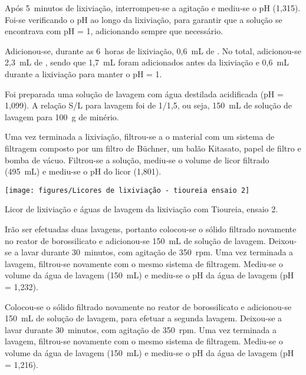 Após 5~minutos de lixiviação, interrompeu-se a agitação e mediu-se o pH (1,315). 
Foi-se verificando o pH ao longo da lixiviação, para garantir que a solução se encontrava com pH = 1, adicionando \acsul{} sempre que necessário.

Adicionou-se, durante as 6~horas de lixiviação, 0,6~mL de \acsul{}. No total, adicionou-se 2,3~mL de \acsul{}, sendo que 1,7~mL foram adicionados antes da lixiviação e 0,6~mL durante a lixiviação para manter o pH = 1.

Foi preparada uma solução de lavagem com água destilada acidificada (pH = 1,099). 
A relação S/L para lavagem foi de 1/1,5, ou seja, 150~mL de solução de lavagem para 100~g de minério.

Uma vez terminada a lixiviação, filtrou-se a o material com um sistema de filtragem composto por um filtro de Büchner, um balão Kitasato, papel de filtro e bomba de vácuo.
Filtrou-se a solução, mediu-se o volume de licor filtrado (495~mL) e mediu-se o pH do licor (1,801).

\begin{marginfigure}
	\centering
	\texttt{[image: figures/Licores de lixiviação - tioureia ensaio 2]}
	\caption{Licor de lixiviação e águas de lavagem da lixiviação com Tioureia, ensaio 2.}
	\label{fig:licores-lixiviacao-tioureia-ensaio2}
\end{marginfigure}

Irão ser efetuadas duas lavagens, portanto colocou-se o sólido filtrado novamente no reator de borossilicato e adicionou-se 150~mL de solução de lavagem.
Deixou-se a lavar durante 30~minutos, com agitação de 350~rpm.
Uma vez terminada a lavagem, filtrou-se novamente com o mesmo sistema de filtragem.
Mediu-se o volume da água de lavagem (150~mL) e mediu-se o pH da água de lavagem (pH = 1,232).


Colocou-se o sólido filtrado novamente no reator de borossilicato e adicionou-se 150~mL de solução de lavagem, para efetuar a segunda lavagem.
Deixou-se a lavar durante 30~minutos, com agitação de 350~rpm.
Uma vez terminada a lavagem, filtrou-se novamente com o mesmo sistema de filtragem.
Mediu-se o volume da água de lavagem (150~mL) e mediu-se o pH da água de lavagem (pH = 1,216).


